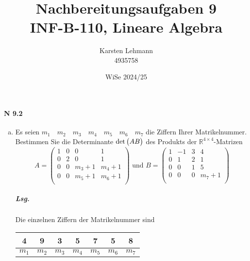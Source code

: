 \documentclass{scrreprt}
\author{Karsten Lehmann \\ 4935758}
\date{WiSe 2024/25}
\title{Nachbereitungsaufgaben 9\\INF-B-110, Lineare Algebra}
\begin{document}
\paragraph{N 9.2}
\begin{enumerate}[(a)]
\item Es seien $m_1 \quad m_2 \quad m_3 \quad m_4 \quad m_5 \quad m_6 \quad m_7$
  die Ziffern Ihrer Matrikelnummer.
  Bestimmen Sie die Determinante $\det\qty\big(AB)$ des Produkts der
  $\mathbb{R}^{4 \times 4}$-Matrizen
  \[
    A = \begin{pmatrix}
      1 & 0 & 0       & 1       \\
      0 & 2 & 0       & 1       \\
      0 & 0 & m_3 + 1 & m_4 + 1 \\
      0 & 0 & m_5 + 1 & m_6 + 1 \\
    \end{pmatrix}
    \text{ und }
    B = \begin{pmatrix}
      1 & -1 & 3 & 4       \\
      0 & 1  & 2 & 1       \\
      0 & 0  & 1 & 5       \\
      0 & 0  & 0 & m_7 + 1 \\
    \end{pmatrix}
  \]

  \subparagraph{Lsg.} Die einzelnen Ziffern der Matrikelnummer sind

  \begin{tabular}{|c|c|c|c|c|c|c|}
    \hline
    4 & 9 & 3 & 5 & 7 & 5 & 8 \\
    \hline
    $m_1$ & $m_2$ & $m_3$ & $m_4$ & $m_5$ & $m_6$ & $m_7$ \\
    \hline
  \end{tabular}


\end{enumerate}
\end{document}
